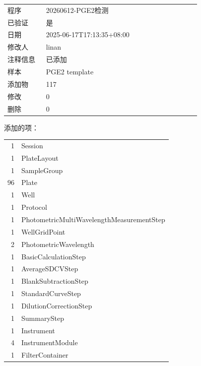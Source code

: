 \documentclass[UTF8,10pt,a4paper,fontset=fandol]{ctexart}
\newcommand{\fieldvalue}[1]{#1}
\begin{document}
\begin{tabular}{@{}p{0.18\linewidth}p{0.72\linewidth}@{}}
程序 &
\fieldvalue{20260612-PGE2检测}\\
已验证 &
\fieldvalue{是}\\
日期 &
\fieldvalue{2025-06-17T17:13:35+08:00}\\
修改人 &
\fieldvalue{linan}\\
注释信息 &
\fieldvalue{已添加}\\
样本 &
\fieldvalue{PGE2 template}\\
添加物 &
\fieldvalue{117}\\
修改 &
\fieldvalue{0}\\
删除 &
\fieldvalue{0}\\
\end{tabular}

\medskip
添加的项：

\begin{tabular}{@{}r@{\quad}l@{}}
1 & Session\\
1 & PlateLayout\\
1 & SampleGroup\\
96 & Plate\\
1 & Well\\
1 & Protocol\\
1 & PhotometricMultiWavelengthMeasurementStep\\
1 & WellGridPoint\\
2 & PhotometricWavelength\\
1 & BasicCalculationStep\\
1 & AverageSDCVStep\\
1 & BlankSubtractionStep\\
1 & StandardCurveStep\\
1 & DilutionCorrectionStep\\
1 & SummaryStep\\
1 & Instrument\\
4 & InstrumentModule\\
1 & FilterContainer
\end{tabular}
\end{document}
